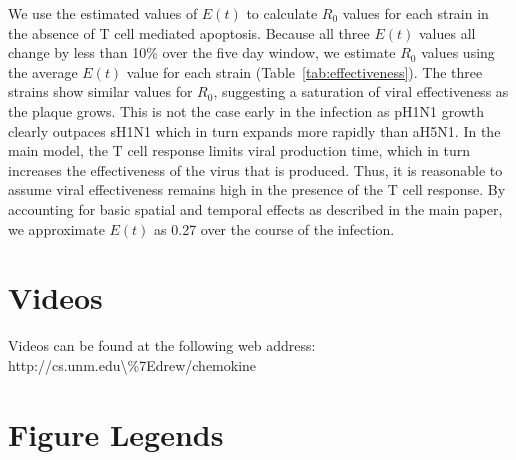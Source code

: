 \documentclass[10pt]{article}
\newcommand{\removed}[1]{{\color{dkred}\sout{#1}}}
\newcommand{\drew}[1]{{\color{dkgreen}#1}}
\newcommand{\fred}[1]{{\color{dkblue}#1}}
\begin{document}
We use the estimated values of $E(t)$ to calculate $R_0$ values for each strain in the absence of T cell mediated apoptosis.  Because all three $E(t)$ values all change by less than 10\% over the five day window, we estimate $R_0$ values using the average $E(t)$ value for each strain (Table~\ref{tab:effectiveness}).  The three strains show similar values for $R_0$, suggesting a saturation of viral effectiveness as the plaque grows.   This is not the case early in the infection as pH1N1 growth clearly outpaces sH1N1 which in turn expands more rapidly than aH5N1.  In the main model, the T cell response limits viral production time, which in turn increases the effectiveness of the virus that is produced.  Thus, it is reasonable to assume viral effectiveness remains high in the presence of the T cell response.  By accounting for basic spatial and temporal effects as described in the main paper, we approximate $E(t)$ as 0.27 over the course of the infection.


%


\section*{Videos}

Videos can be found at the following web address: http://cs.unm.edu\textbackslash\%7Edrew/chemokine




\pagebreak

\section*{Figure Legends}
\end{document}

